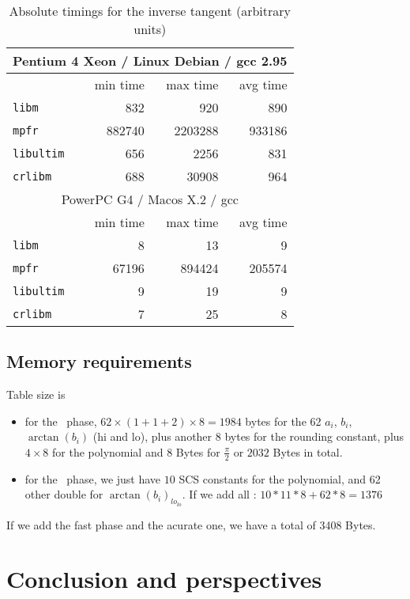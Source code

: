 \begin{table}[!htb]
\begin{center}
\renewcommand{\arraystretch}{1.2}
\begin{tabular}{|l|r|r|r|}
\hline
\hline

 \multicolumn{4}{|c|}{Pentium 4 Xeon / Linux Debian / gcc 2.95}   \\
 \hline
                         & min time      & max time      & avg time \\
 \hline
 \texttt{libm}           & 832          & 920           &        890 \\
 \hline
  \texttt{mpfr}          & 882740       & 2203288       &     933186 \\
 \hline
  \texttt{libultim}      & 656          & 2256          &        831 \\
 \hline
 \texttt{crlibm}         & 688          & 30908         &        964 \\
 \hline


\multicolumn{4}{|c|}{PowerPC G4 / Macos X.2 / gcc }   \\
 \hline
                         & min time      & max time      & avg time \\
 \hline
 \texttt{libm}           & 8            & 13            &          9 \\
 \hline
  \texttt{mpfr}          & 67196        & 894424        &     205574 \\
 \hline
  \texttt{libultim}      & 9            & 19            &          9 \\
 \hline
 \texttt{crlibm}         & 7            & 25            &          8 \\
 \hline

\end{tabular}
\end{center}
\caption{Absolute timings for the inverse tangent (arbitrary units)
  \label{tbl:arctan_abstime}}
\end{table}

\subsection{Memory requirements}
Table size is
\begin{itemize}
\item for the \quick\ phase,
  $62\times (1+1+2) \times8=1984$ bytes for the 62 $a_i$, $b_i$,
  $\arctan(b_i)$ (hi and lo), plus another $8$ bytes for the rounding
  constant, plus $4\times8$ for the polynomial and $8$ Bytes for
  $\frac{\pi}{2}$ or $2032$ Bytes in total.
  
\item for the \accurate\ phase, we just have $10$ SCS constants for the
  polynomial, and 62 other double for $\arctan(b_i)_{lo_{lo}}$.
  If we add all : $10*11*8 + 62*8 = 1376$
\end{itemize}
If we add the fast phase and the acurate one, we have a total of 3408
Bytes.
\section{Conclusion and perspectives}

